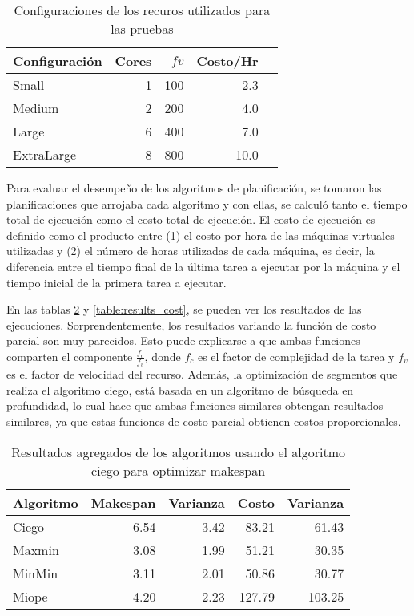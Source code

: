 \begin{table}[ht]
\centering
\begin{tabular}{lrrrr}
  \hline
Configuraci\'on & Cores & $fv$ & Costo/Hr \\ 
  \hline
  Small & 1 & 100 & 2.3 \\ 
  Medium & 2 & 200 & 4.0 \\ 
  Large & 6 & 400 & 7.0 \\ 
  ExtraLarge & 8 & 800 & 10.0 \\ 
   \hline
\end{tabular}
\caption{Configuraciones de los recuros utilizados para las pruebas} 
\label{table:resource_configurations}
\end{table}

Para evaluar el desempeño de los algoritmos de planificación, se tomaron las planificaciones que arrojaba cada algoritmo y con ellas, se calculó tanto el tiempo total de ejecución como el costo total de ejecución. El costo de ejecución es definido como el producto entre (1) el costo por hora de las máquinas virtuales utilizadas y (2) el número de horas utilizadas de cada máquina, es decir, la diferencia entre el tiempo final de la última tarea a ejecutar por la máquina y el tiempo inicial de la primera tarea a ejecutar.

En las tablas \ref{table:results_makespan} y \ref{table:results_cost}, se pueden ver los resultados de las ejecuciones. Sorprendentemente, los resultados variando la funci\'on de costo parcial son muy parecidos. Esto puede explicarse a que ambas funciones comparten el componente $\frac{f_c}{f_v}$, donde $f_c$ es el factor de complejidad de la tarea y $f_v$ es el factor de velocidad del recurso. Además, la optimización de segmentos que realiza el algoritmo ciego, está basada en un algoritmo de búsqueda en profundidad, lo cual hace que ambas funciones similares obtengan resultados similares, ya que estas funciones de costo parcial obtienen costos proporcionales.


\begin{table}[ht]
\centering
\begin{tabular}{lrrrr}
  \hline
Algoritmo & Makespan & Varianza & Costo & Varianza \\ 
  \hline
  Ciego & 6.54 & 3.42 & 83.21 & 61.43 \\ 
  Maxmin & 3.08 & 1.99 & 51.21 & 30.35 \\ 
  MinMin & 3.11 & 2.01 & 50.86 & 30.77 \\ 
  Miope & 4.20 & 2.23 & 127.79 & 103.25 \\ 
  \hline
\end{tabular}
\caption{Resultados agregados de los algoritmos usando el algoritmo ciego para optimizar makespan} 
\label{table:results_makespan}
\end{table}



